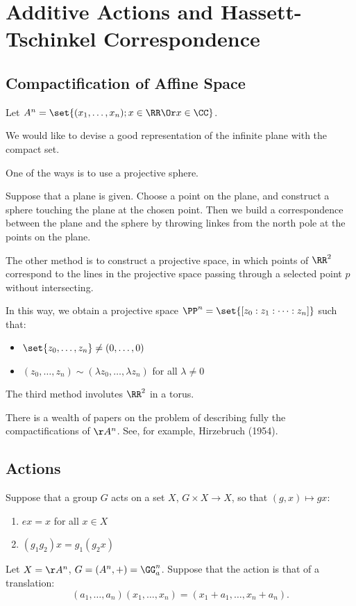 \documentclass[11pt]{scrartcl}
\begin{document}
  \section{Additive Actions and Hassett-Tschinkel Correspondence}
  \subsection{Compactification of Affine Space}
  Let $A^{n} = \set{(x_{1}, \dots, x_{n}); x\in\RR \Or x\in\CC}$.

  We would like to devise a good representation of the infinite plane
  with the compact set.
  
  One of the ways is to use a projective sphere.

  Suppose that a plane is given. Choose a point on the plane, and
  construct a sphere touching the plane at the chosen point. Then we
  build a correspondence between the plane and the sphere by throwing
  linkes from the north pole at the points on the plane.

  The other method is to construct a projective space, in which points
  of $\RR^{2}$ correspond to the lines in the projective space passing
  through a selected point $p$ without intersecting.

  In this way, we obtain a projective space
  $\PP^{n} = \set{[z_{0}:z_{1}:\dots:z_{n}]}$ such that:
  \begin{itemize}
  \item $\set{z_{0}, \dots, z_{n}} \neq (0, \dots, 0)$
  \item $(z_{0}, \dots, z_{n}) \sim (\lambda z_{0}, \dots, \lambda z_{n})$ for all $\lambda \neq 0$
  \end{itemize}

  The third method involutes $\RR^{2}$ in a torus.

  There is a wealth of papers on the problem of describing fully the
  compactifications of $\AA^{n}$. See, for example, Hirzebruch (1954).
  \subsection{Actions}

  Suppose that a group $G$ acts on a set $X$, $G\times X \to X$, so that $(g, x) \mapsto gx$:
  \begin{enumerate}
  \item $ex = x$ for all $x\in X$
  \item $(g_{1}g_{2})x = g_{1}(g_{2}x)$  
  \end{enumerate}
  \begin{example}

    Let $X = \AA^{n}$, $G=(A^{n}, +) = \GG_{a}^{n}$. Suppose that the action is that of a translation:
    \begin{equation*}
      (a_{1}, \dots, a_{n})(x_{1}, \dots, x_{n}) = (x_{1} + a_{1}, \dots, x_{n} + a_{n}).
    \end{equation*}


  \end{example}
\end{document}
